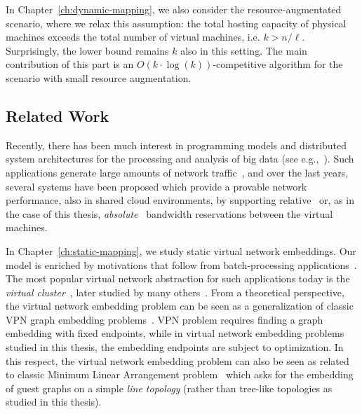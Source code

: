 In Chapter~\ref{ch:dynamic-mapping}, we also consider the resource-augmentated scenario, where we relax this assumption: the total hosting capacity of physical machines exceeds the total number of virtual machines, i.e. $k > n/\ell$.
Surprisingly, the lower bound remains $k$ also in this setting.
The main contribution of this part is an $O(k\cdot \log(k))$-competitive algorithm for the scenario with small resource augmentation.



\subsection{Related Work}


Recently, there has been much interest in programming models and distributed
system architectures for the processing and analysis of big data (see e.g.,~\cite{nodb,mapreduce,shark}).
Such applications
generate large amounts of network traffic~\cite{orchestra,talk-about,amazonbw},
and over the last years, several systems have been proposed which provide
a provable network performance, also in shared cloud environments, by supporting
relative~\cite{faircloud,elasticswitch,seawall}
or, as in the case of this thesis, \emph{absolute}~\cite{oktopus,secondnet,drl,gatekeeper,proteus} bandwidth reservations
between the virtual machines.

In Chapter~\ref{ch:static-mapping}, we study static virtual network embeddings.
Our model is enriched by motivations that follow from batch-processing applications~\cite{mapreduce}.
The most popular virtual network abstraction for such applications today is the \emph{virtual cluster}~\cite{oktopus}, later studied by many others~\cite{talk-about,infocom16,ccr15emb,proteus}.
From a theoretical perspective, the virtual network embedding problem can be seen as a generalization
of classic VPN graph embedding problems~\cite{Goyal2008,gupta2001provisioning}. VPN problem requires finding a graph embedding with fixed endpoints, while in virtual network embedding problems studied in this thesis, the embedding endpoints are subject to optimization.
In this respect, the virtual network embedding problem can also be seen as related to
classic Minimum Linear Arrangement problem~\cite{mla-schmoys} which asks for the
embedding of guest graphs on a simple \emph{line topology} (rather than tree-like topologies as
studied in this thesis).

